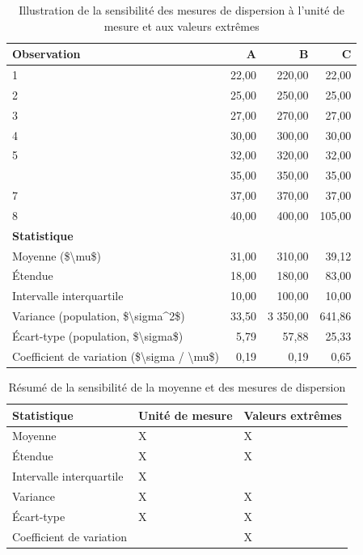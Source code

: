 \documentclass[
  11pt,
  french,
]{book}
\begin{document}
\begin{table}

\caption{\label{tab:datavar2}Illustration de la sensibilité des mesures de dispersion à l'unité de mesure et aux valeurs extrêmes}
\centering
\fontsize{8}{10}\selectfont
\begin{tabular}[t]{lrrr}
\toprule
Observation & A & B & C\\
\midrule
1 & 22,00 & 220,00 & 22,00\\
2 & 25,00 & 250,00 & 25,00\\
3 & 27,00 & 270,00 & 27,00\\
4 & 30,00 & 300,00 & 30,00\\
5 & 32,00 & 320,00 & 32,00\\
\addlinespace
6 & 35,00 & 350,00 & 35,00\\
7 & 37,00 & 370,00 & 37,00\\
8 & 40,00 & 400,00 & 105,00\\
\textbf{Statistique} & \textbf{} & \textbf{} & \textbf{}\\
Moyenne (\$\textbackslash{}mu\$) & 31,00 & 310,00 & 39,12\\
\addlinespace
Étendue & 18,00 & 180,00 & 83,00\\
Intervalle interquartile & 10,00 & 100,00 & 10,00\\
Variance (population, \$\textbackslash{}sigma\textasciicircum{}2\$) & 33,50 & 3 350,00 & 641,86\\
Écart-type (population, \$\textbackslash{}sigma\$) & 5,79 & 57,88 & 25,33\\
Coefficient de variation (\$\textbackslash{}sigma / \textbackslash{}mu\$) & 0,19 & 0,19 & 0,65\\
\bottomrule
\end{tabular}
\end{table}

\begin{table}

\caption{\label{tab:resume}Résumé de la sensibilité de la moyenne et des mesures de dispersion}
\centering
\fontsize{8}{10}\selectfont
\begin{tabular}[t]{lll}
\toprule
Statistique & Unité de mesure & Valeurs extrêmes\\
\midrule
Moyenne & X & X\\
Étendue & X & X\\
Intervalle interquartile & X & \\
Variance & X & X\\
Écart-type & X & X\\
\addlinespace
Coefficient de variation &  & X\\
\bottomrule
\end{tabular}
\end{table}
\end{document}
